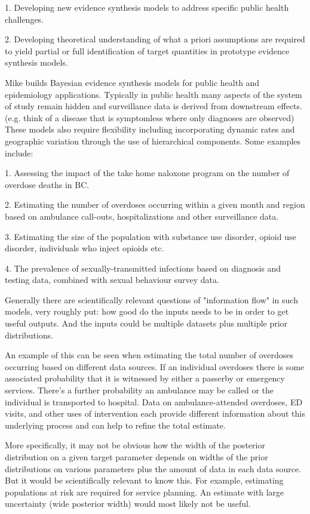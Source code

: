 \documentclass[
10pt, %
a4paper, %
oneside, %
headinclude,footinclude, %
BCOR5mm, %
]{scrartcl}
\begin{document}
1. Developing new evidence synthesis models to address specific public health challenges.

2. Developing theoretical understanding of what a priori assumptions are required to yield partial or full identification of target quantities in prototype evidence synthesis models.

Mike builds Bayesian evidence synthesis models for public health and epidemiology applications. Typically in public health many aspects of the system of study remain hidden and surveillance data is derived from downstream effects. (e.g. think of a disease that is symptomless where only diagnoses are observed) These models also require flexibility including incorporating dynamic rates and geographic variation through the use of hierarchical components. Some examples include:

1. Assessing the impact of the take home naloxone program on the number of overdose deaths in BC.

2. Estimating the number of overdoses occurring within a given month and region based on ambulance call-outs, hospitalizations and other surveillance data.

3. Estimating the size of the population with substance use disorder, opioid use disorder, individuals who inject opioids etc.

4. The prevalence of sexually-transmitted infections based on diagnosis and testing data, combined with sexual behaviour survey data.

Generally there are scientifically relevant questions of "information flow" in such models, very roughly put: how good do the inputs needs to be in order to get useful outputs. And the inputs could be multiple datasets plus multiple prior distributions.

An example of this can be seen when estimating the total number of overdoses occurring based on different data sources. If an individual overdoses there is some associated probability that it is witnessed by either a passerby or emergency services. There’s a further probability an ambulance may be called or the individual is transported to hospital. Data on ambulance-attended overdoses, ED visits, and other uses of intervention each provide different information about this underlying process and can help to refine the total estimate.

More specifically, it may not be obvious how the width of the posterior distribution on a given target parameter depends on widths of the prior distributions on various parameters plus the amount of data in each data source. But it would be scientifically relevant to know this. For example, estimating populations at risk are required for service planning. An estimate with large uncertainty (wide posterior width) would most likely not be useful. 
\end{document}
